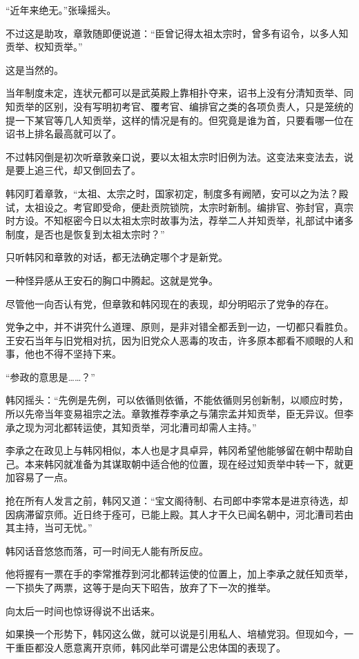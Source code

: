 “近年来绝无。”张璪摇头。

不过这是助攻，章敦随即便说道：“臣曾记得太祖太宗时，曾多有诏令，以多人知贡举、权知贡举。”

这是当然的。

当年制度未定，连状元都可以是武英殿上靠相扑夺来，诏书上没有分清知贡举、同知贡举的区别，没有写明初考官、覆考官、编排官之类的各项负责人，只是笼统的提一下某官等几人知贡举，这样的情况是有的。但究竟是谁为首，只要看哪一位在诏书上排名最高就可以了。

不过韩冈倒是初次听章敦亲口说，要以太祖太宗时旧例为法。这变法来变法去，说是要上追三代，却又倒回去了。

韩冈盯着章敦，“太祖、太宗之时，国家初定，制度多有阙陋，安可以之为法？殿试，太祖设之。考官即受命，便赴贡院锁院，太宗时新制。编排官、弥封官，真宗时方设。不知枢密今日以太祖太宗时故事为法，荐举二人并知贡举，礼部试中诸多制度，是否也是恢复到太祖太宗时？”

只听韩冈和章敦的对话，都无法确定哪个才是新党。

一种怪异感从王安石的胸口中腾起。这就是党争。

尽管他一向否认有党，但章敦和韩冈现在的表现，却分明昭示了党争的存在。

党争之中，并不讲究什么道理、原则，是非对错全都丢到一边，一切都只看胜负。王安石当年与旧党相对抗，因为旧党众人恶毒的攻击，许多原本都看不顺眼的人和事，他也不得不坚持下来。

“参政的意思是……？”

韩冈摇头：“先例是先例，可以依循则依循，不能依循则另创新制，以顺应时势，所以先帝当年变易祖宗之法。章敦推荐李承之与蒲宗孟并知贡举，臣无异议。但李承之现为河北都转运使，其知贡举，河北漕司却需人主持。”

李承之在政见上与韩冈相似，本人也是才具卓异，韩冈希望他能够留在朝中帮助自己。本来韩冈就准备为其谋取朝中适合他的位置，现在经过知贡举中转一下，就更加容易了一点。

抢在所有人发言之前，韩冈又道：“宝文阁待制、右司郎中李常本是进京待选，却因病滞留京师。近日终于痊可，已能上殿。其人才干久已闻名朝中，河北漕司若由其主持，当可无忧。”

韩冈话音悠悠而落，可一时间无人能有所反应。

他将握有一票在手的李常推荐到河北都转运使的位置上，加上李承之就任知贡举，一下损失了两票，这等于是向天下昭告，放弃了下一次的推举。

向太后一时间也惊讶得说不出话来。

如果换一个形势下，韩冈这么做，就可以说是引用私人、培植党羽。但现如今，一干重臣都没人愿意离开京师，韩冈此举可谓是公忠体国的表现了。

